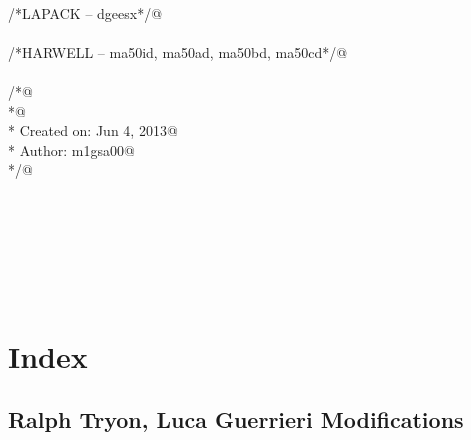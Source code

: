 \documentclass[12pt]{article}
\begin{document}
\begin{flushleft}
\begin{minipage}{\linewidth}
\begin{list}{}{}
\mbox{}\verb@@\\
\mbox{}\verb@/*LAPACK -- dgeesx*/@\\
\mbox{}\verb@@\\
\mbox{}\verb@/*HARWELL -- ma50id, ma50ad, ma50bd, ma50cd*/@\\
\mbox{}\verb@@\\
\mbox{}\verb@/*@\\
\mbox{}\verb@ *@\\
\mbox{}\verb@ *  Created on: Jun 4, 2013@\\
\mbox{}\verb@ *      Author: m1gsa00@\\
\mbox{}\verb@ */@\\
\mbox{}\verb@@\\
\mbox{}\verb@@\\
\mbox{}\verb@@\\
\mbox{}\verb@@\\
\mbox{}\verb@@\\
\mbox{}\verb@@\\
\mbox{}\verb@@{\NWsep}
\end{list}
\vspace{-1.5ex}
\footnotesize
\begin{list}{}{\setlength{\itemsep}{-\parsep}\setlength{\itemindent}{-\leftmargin}}

\item{}
\end{list}
\end{minipage}\vspace{4ex}
\end{flushleft}
\appendix

\section{Index}
\label{sec:index}

\subsection{Ralph Tryon, Luca Guerrieri Modifications}
\label{sec:ralph-tryon-modif}
\end{document}
